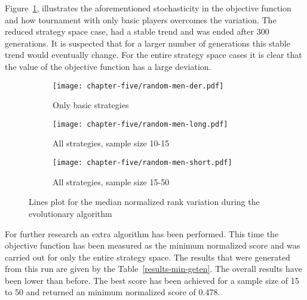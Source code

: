 Figure~\ref{fig:line-plots-median}, illustrates the aforementioned stochasticity
in the objective function and how tournament with only basic players
overcomes the variation. The reduced strategy space case, had a stable trend and was
ended after 300 generations. It is suspected that for a larger number of generations
this stable trend would eventually change. For the entire strategy space cases it is
clear that the value of the objective function has a large deviation.

\begin{figure}[H]
	\centering
	\begin{subfigure}[H]{0.45\textwidth}
		\centering
		\texttt{[image: chapter-five/random-men-der.pdf]}
		\caption{Only basic strategies}
	\end{subfigure}
	\hfill
	\begin{subfigure}[H]{0.45\textwidth}
		\centering
		\texttt{[image: chapter-five/random-men-long.pdf]}
		\caption{All strategies, sample size 10-15}
	\end{subfigure}
  \hfill
  \begin{subfigure}[H]{0.45\textwidth}
    \centering
    \texttt{[image: chapter-five/random-men-short.pdf]}
    \caption{All strategies, sample size 15-50}
  \end{subfigure}
	\caption{Lines plot for the median normalized rank variation during the
          evolutionary algorithm}
	\label{fig:line-plots-median}
\end{figure}

For further research an extra algorithm has been performed. This time the
objective function has been measured as the minimum normalized score and was carried
out for only the entire strategy space. The results
that were generated from this run are given by the Table~\ref{results-min-geten}.
The overall results have been lower than before. The best score has been achieved for
a sample size of 15 to 50 and returned an minimum normalized score of 0.478.

